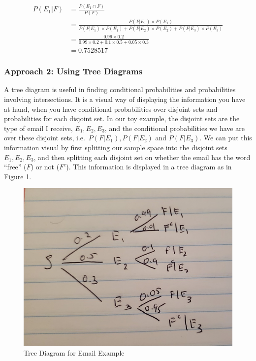 \documentclass[
]{book}
\begin{document}
\[
\begin{split}
P(E_1|F) &= \frac{P(E_1 \cap F)}{P(F)}\\
 &= \frac{P(F|E_1) \times P(E_1)}{P(F|E_1) \times P(E_1) + P(F|E_2) \times P(E_2) + P(F|E_3) \times P(E_3)} \\
&= \frac{0.99 \times 0.2}{0.99 \times 0.2 + 0.1 \times 0.5 + 0.05 \times 0.3}\\
&= 0.7528517
\end{split}
\]

\subsubsection{Approach 2: Using Tree Diagrams}\label{approach-2-using-tree-diagrams}

A tree diagram is useful in finding conditional probabilities and probabilities involving intersections. It is a visual way of displaying the information you have at hand, when you have conditional probabilities over disjoint sets and probabilities for each disjoint set. In our toy example, the disjoint sets are the type of email I receive, \(E_1, E_2, E_3\), and the conditional probabilities we have are over these disjoint sets, i.e.~\(P(F|E_1), P(F|E_2)\) and \(P(F|E_3)\). We can put this information visual by first splitting our sample space into the disjoint sets \(E_1, E_2, E_3\), and then splitting each disjoint set on whether the email has the word ``free'' (\(F\)) or not (\(F^c\)). This information is displayed in a tree diagram as in Figure \ref{fig:tree}.

\begin{figure}
\centering
\includegraphics{images/02-tree.jpg}
\caption{\label{fig:tree}Tree Diagram for Email Example}
\end{figure}
\end{document}
